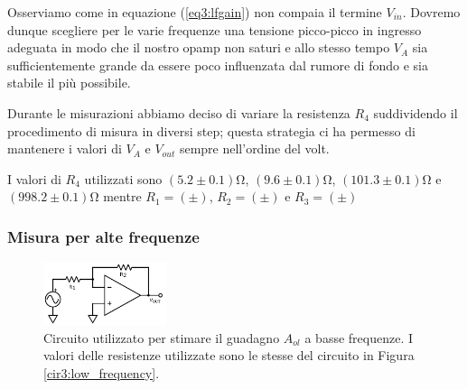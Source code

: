 Osserviamo come in equazione (\ref{eq3:lfgain}) non compaia il termine $V_{in}$.
Dovremo dunque scegliere per le varie frequenze una tensione picco-picco in ingresso adeguata in modo che il nostro opamp non saturi e allo stesso tempo $V_A$ sia sufficientemente grande da essere poco influenzata dal rumore di fondo e sia stabile il più possibile.


Durante le misurazioni abbiamo deciso di variare la resistenza $R_4$ suddividendo il procedimento di misura in diversi step; questa strategia ci ha permesso di mantenere i valori di $V_A$ e $V_{out}$ sempre nell'ordine del volt. 

I valori di $R_4$ utilizzati sono $(5.2\pm 0.1)\si{\ohm}$,  $(9.6\pm0.1)\si{\ohm}$, $(101.3\pm 0.1) \si{\ohm}$ e $(998.2\pm 0.1 ) \si{\ohm}$ mentre $R_1=(\pm)$, $R_2=(\pm)$ e $R_3=(\pm)$

\subsubsection*{Misura per alte frequenze}

\begin{figure}
  \begin{center}
    \includegraphics[width=0.32\textwidth]{../E03/latex/HF_ol.pdf}
  \end{center}
  \caption{Circuito utilizzato per stimare il guadagno $A_{ol}$ a basse frequenze. I valori delle resistenze utilizzate sono le stesse del circuito in Figura \ref{cir3:low_frequency}.}
  \label{cir3:high_frequency}
\end{figure}

